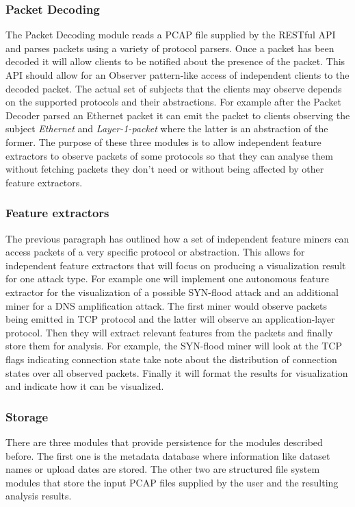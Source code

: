 \subsubsection{Packet Decoding}
The Packet Decoding module reads a PCAP file supplied by the RESTful API and parses packets using a variety of protocol parsers. Once a packet has been decoded it will allow clients to be notified about the presence of the packet. This API should allow for an Observer pattern-like access of independent clients to the decoded packet. The actual set of subjects that the clients may observe depends on the supported protocols and their abstractions. For example after the Packet Decoder parsed an Ethernet packet it can emit the packet to clients observing the subject \textit{Ethernet} and \textit{Layer-1-packet} where the latter is an abstraction of the former. The purpose of these three modules is to allow independent feature extractors to observe packets of some protocols so that they can analyse them without fetching packets they don't need or without being affected by other feature extractors.

\subsubsection{Feature extractors}
The previous paragraph has outlined how a set of independent feature miners can access packets of a very specific protocol or abstraction. This allows for independent feature extractors that will focus on producing a visualization result for one attack type. For example one will implement one autonomous feature extractor for the visualization of a possible SYN-flood attack and an additional miner for a DNS amplification attack. The first miner would observe packets being emitted in TCP protocol and the latter will observe an application-layer protocol. Then they will extract relevant features from the packets and finally store them for analysis. For example, the SYN-flood miner will look at the TCP flags indicating connection state take note about the distribution of connection states over all observed packets. Finally it will format the results for visualization and indicate how it can be visualized.

\subsubsection{Storage}
There are three modules that provide persistence for the modules described before. The first one is the metadata database where information like dataset names or upload dates are stored. The other two are structured file system modules that store the input PCAP files supplied by the user and the resulting analysis results.

